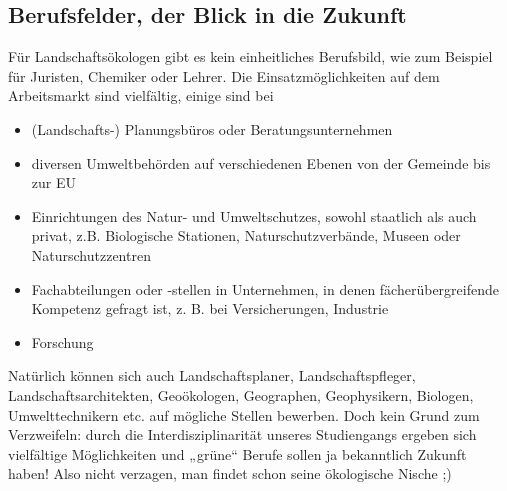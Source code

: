 \subsection*{Berufsfelder, der Blick in die Zukunft}
Für Landschaftsökologen gibt es kein einheitliches Berufsbild, wie zum Beispiel für Juristen, Chemiker oder Lehrer. Die Einsatzmöglichkeiten auf dem Arbeitsmarkt sind vielfältig, einige sind bei
\begin{itemize}
  \item (Landschafts-) Planungsbüros oder Beratungsunternehmen
  \item diversen Umweltbehörden auf verschiedenen Ebenen von der Gemeinde bis zur EU
  \item Einrichtungen des Natur- und Umweltschutzes, sowohl staatlich als auch privat, z.B. Biologische Stationen, Naturschutzverbände, Museen oder Naturschutzzentren
  \item Fachabteilungen oder -stellen in Unternehmen, in denen fächerübergreifende Kompetenz gefragt ist, z. B. bei Versicherungen, Industrie
  \item{Forschung}
\end{itemize}
Natürlich können sich auch Landschaftsplaner, Landschaftspfleger, Landschaftsarchitekten, Geoökologen, Geographen, Geophysikern, Biologen, Umwelttechnikern etc. auf mögliche Stellen bewerben. Doch kein Grund zum Verzweifeln: durch die Interdisziplinarität unseres Studiengangs ergeben sich vielfältige Möglichkeiten und „grüne“ Berufe sollen ja bekanntlich Zukunft haben! Also nicht verzagen, man findet schon seine ökologische Nische ;)



